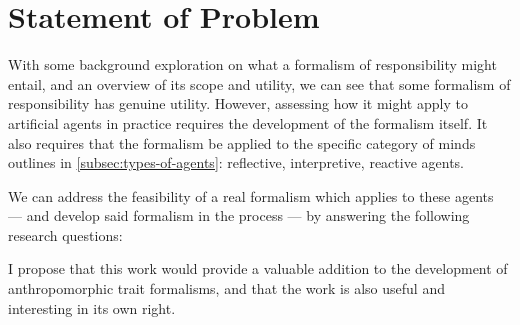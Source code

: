 \section{Statement of Problem}\label{sec:statement_of_problem}

With some background exploration on what a formalism of responsibility might entail, and an overview of its scope and utility, we can see that some formalism of responsibility has genuine utility. However, assessing how it might apply to artificial agents in practice requires the development of the formalism itself. It also requires that the formalism be applied to the specific category of minds outlines in \cref{subsec:types-of-agents}: reflective, interpretive, reactive agents. \par

We can address the feasibility of a real formalism which applies to these agents --- and develop said formalism in the process --- by answering the following research questions:



I propose that this work would provide a valuable addition to the development of anthropomorphic trait formalisms, and that the work is also useful and interesting in its own right.

